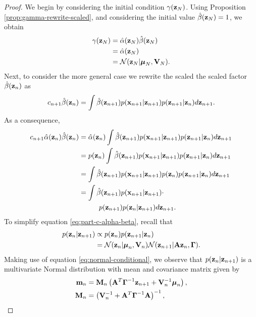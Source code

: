 \documentclass[11pt]{article}
\numberwithin{equation}{section}
\newcommand{\x}{{\bf x}}
\newcommand{\z}{{\bf z}}
\newcommand{\N}{\mathcal{N}}
\begin{document}
\begin{proof}
	We begin by considering the initial condition $\gamma(\z_N)$. Using Proposition \ref{prop:gamma-rewrite-scaled}, and considering the initial value $\hat\beta(\z_N)=1$, we obtain
	\begin{align}
		\gamma(\z_N) &= \hat\alpha(\z_N)\hat\beta(\z_N)\\
					 &= \hat\alpha(\z_N)\\
					 &= \N(\z_N \vert \boldsymbol\mu_N, {\bf V}_N).
	\end{align}
	Next, to consider the more general case we rewrite the scaled the scaled factor $\hat\beta(\z_n)$ as
	\begin{equation}
		c_{n+1} \hat\beta(\z_n) = \int \hat\beta(\z_{n+1}) p(\x_{n+1} \vert \z_{n+1}) p(\z_{n+1} \vert \z_n) d\z_{n+1}.
	\end{equation}
	As a consequence,	
	\begin{align}
		c_{n+1}\hat\alpha(\z_n)\hat\beta(\z_n) &= \hat\alpha(\z_n) \int \hat\beta(\z_{n+1}) p(\x_{n+1} \vert \z_{n+1}) p(\z_{n+1} \vert \z_n) d\z_{n+1}\\
		&= p(\z_n)\int \hat\beta(\z_{n+1}) p(\x_{n+1}\vert \z_{n+1})p(\z_{n+1}\vert \z_n) d\z_{n+1}\\
		&= \int \hat\beta(\z_{n+1}) p(\x_{n+1}\vert \z_{n+1}) p(\z_n) p(\z_{n+1}\vert \z_n) d\z_{n+1}\\
		&= \int \hat\beta(\z_{n+1 }) p(\x_{n+1}\vert \z_{n+1}) \cdot \nonumber\\
		&\hspace{1cm} p(\z_{n+1}) p(\z_{n}\vert \z_{n+1}) d\z_{n+1}. \label{eq:part-c-alpha-beta}
	\end{align}
	To simplify equation \eqref{eq:part-c-alpha-beta}, recall that
	\begin{align}
		p(\z_n\vert \z_{n+1}) &\propto p(\z_n) p(\z_{n+1} \vert \z_n) \\
		&= \N(\z_n \vert\boldsymbol\mu_n, {\bf V}_n) \N(\z_{n+1} \vert {\bf A}\z_n, \boldsymbol\Gamma).
	\end{align}
	Making use of equation \eqref{eq:normal-conditional}, we observe that $p(\z_n \vert \z_{n+1})$ is a multivariate Normal distribution with mean and covariance matrix given by
	\begin{align}
		{\bf m}_n &= {\bf M}_n \left({\bf A}^T\boldsymbol\Gamma^{-1}\z_{n+1} + {\bf V}_n^{-1}\boldsymbol\mu_n\right),\\
		{\bf M}_n &= \left( {\bf V}_n^{-1}  + {\bf A}^T\boldsymbol{\Gamma}^{-1}{\bf A} \right)^{-1},

\end{align}
\end{proof}
\end{document}
